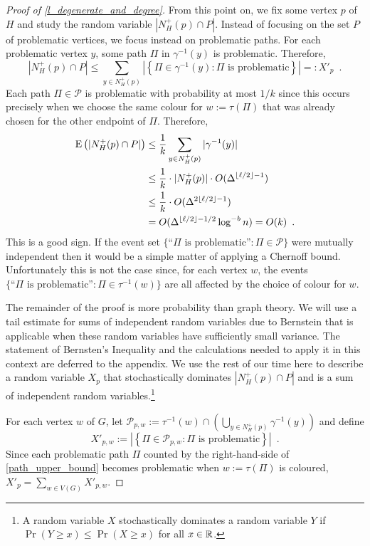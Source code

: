 \documentclass{patmorin}
\begin{document}
\begin{proof}[Proof of \cref{l_degenerate_and_degree}]
  From this point on, we fix some vertex $p$ of $H$ and study the random variable $|N_H^+(p)\cap P|$.  Instead of focusing on the set $P$ of problematic vertices, we focus instead on problematic paths.  For each problematic vertex $y$, some path $\Pi$ in $\gamma^{-1}(y)$ is problematic. Therefore,
  \begin{equation}
    |N^+_H(p)\cap P| \le \sum_{y\in N^+_H(p)} \left|\left\{\Pi\in\gamma^{-1}(y): \text{$\Pi$ is problematic}\right\}\right| =: X'_{p} \enspace .
    \label{path_upper_bound}
  \end{equation}
  Each path $\Pi\in\mathcal{P}$ is problematic with probability at most $1/k$ since this occurs precisely when we choose the same colour for $w:=\tau(\Pi)$ that was already chosen for the other endpoint of $\Pi$.  Therefore,
  \begin{align*}
    \mathrm{E}\left(|N^+_H(p)\cap P|\right)
    & \le \frac{1}{k}\sum_{y\in N^+_H(p)}|\gamma^{-1}(y)| \\
    & \le \frac{1}{k}\cdot|N^+_H(p)|\cdot O(\Delta^{\lfloor\ell /2\rfloor-1}) \\
    & \le \frac{1}{k}\cdot O(\Delta^{2\lfloor\ell /2\rfloor-1}) \\
    & = O(\Delta^{\lfloor\ell /2\rfloor-1/2}\log^{-b} n) = O(k) \enspace .
  \end{align*}
  This is a good sign. If the event set $\{\text{``$\Pi$ is problematic''}:\Pi\in\mathcal{P}\}$ were mutually independent then it would be a simple matter of applying a Chernoff bound.  Unfortunately this is not the case since, for each vertex $w$, the events $\{\text{``$\Pi$ is problematic''}:\Pi\in\tau^{-1}(w)\}$ are all affected by the choice of colour for $w$.

  The remainder of the proof is more probability than graph theory.  We will use a tail estimate for sums of independent random variables due to Bernstein that is applicable when these random variables have sufficiently small variance.  The statement of Bernsten's Inequality and the calculations needed to apply it in this context are deferred to the appendix. We use the rest of our time here to describe a random variable $X_p$ that stochastically dominates $|N^+_H(p)\cap P|$ and is a sum of independent random variables.\footnote{A random variable $X$ stochastically dominates a random variable $Y$ if $\Pr(Y\ge x) \le \Pr(X\ge x)$ for all $x\in\mathbb{R}$.}

  For each vertex $w$ of $G$, let $\mathcal{P}_{p,w}:=\tau^{-1}(w)\cap (\bigcup_{y\in N^+_H(p)}\gamma^{-1}(y))$ and define
  \[
    X'_{p,w} :=\left|\left\{\Pi\in\mathcal{P}_{p,w}:\text{$\Pi$ is problematic}\right\}\right|
    \enspace .
  \]
  Since each problematic path $\Pi$ counted by the right-hand-side of \cref{path_upper_bound} becomes problematic when $w:=\tau(\Pi)$ is coloured, $X'_p=\sum_{w\in V(G)} X'_{p,w}$.


\end{proof}
\end{document}
